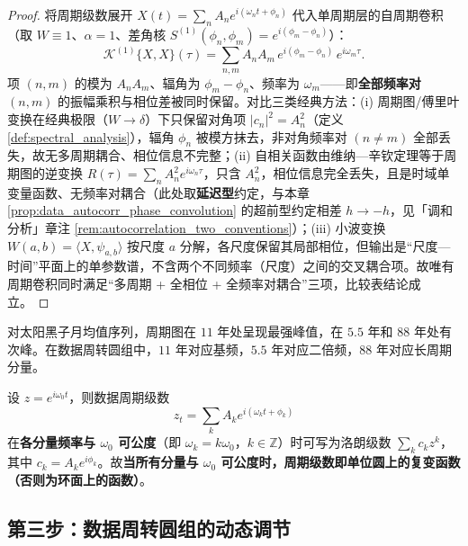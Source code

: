 \begin{proof}
将周期级数展开 $X(t) = \sum_n A_n e^{i(\omega_n t + \phi_n)}$ 代入单周期层的自周期卷积（取 $W \equiv 1$、$\alpha = 1$、差角核 $S^{(1)}(\phi_n, \phi_m) = e^{i(\phi_m - \phi_n)}$）：
\[
\mathcal{K}^{(1)}\{X, X\}(\tau) = \sum_{n,m} A_n A_m \, e^{i(\phi_m - \phi_n)} \, e^{i\omega_m \tau}.
\]
项 $(n,m)$ 的模为 $A_n A_m$、辐角为 $\phi_m - \phi_n$、频率为 $\omega_m$——即\textbf{全部频率对} $(n,m)$ 的振幅乘积与相位差被同时保留。对比三类经典方法：(i) 周期图/傅里叶变换在经典极限（$W \to \delta$）下只保留对角项 $|c_n|^2 = A_n^2$（定义 \ref{def:spectral_analysis}），辐角 $\phi_n$ 被模方抹去，非对角频率对 $(n \neq m)$ 全部丢失，故无多周期耦合、相位信息不完整；(ii) 自相关函数由维纳—辛钦定理等于周期图的逆变换 $R(\tau) = \sum_n A_n^2 e^{i\omega_n \tau}$，只含 $A_n^2$，相位信息完全丢失，且是时域单变量函数、无频率对耦合（此处取\textbf{延迟型}约定，与本章 \cref{prop:data_autocorr_phase_convolution} 的超前型约定相差 $h\to-h$，见「调和分析」章注 \ref{rem:autocorrelation_two_conventions}）；(iii) 小波变换 $W(a,b) = \langle X, \psi_{a,b}\rangle$ 按尺度 $a$ 分解，各尺度保留其局部相位，但输出是“尺度—时间”平面上的单参数谱，不含两个不同频率（尺度）之间的交叉耦合项。故唯有周期卷积同时满足“多周期 + 全相位 + 全频率对耦合”三项，比较表结论成立。
\end{proof}

\begin{example}[数据周期级数构建实例]\label{ex:data_series_example}
对太阳黑子月均值序列，周期图在 $11$ 年处呈现最强峰值，在 $5.5$ 年和 $88$ 年处有次峰。在数据周转圆组中，$11$ 年对应基频，$5.5$ 年对应二倍频，$88$ 年对应长周期分量。
\end{example}

\begin{remark}[周期级数即复变函数]\label{rem:data_series_complex}
设 $z=e^{i\omega_0t}$，则数据周期级数
\[
z_t=\sum_k A_k e^{i(\omega_k t+\phi_k)}
\]
在\textbf{各分量频率与 $\omega_0$ 可公度}（即 $\omega_k=k\omega_0$，$k\in\mathbb Z$）时可写为洛朗级数 $\sum_k c_k z^k$，其中 $c_k=A_k e^{i\phi_k}$。故\textbf{当所有分量与 $\omega_0$ 可公度时，周期级数即单位圆上的复变函数（否则为环面上的函数）}。
\end{remark}

\subsection{第三步：数据周转圆组的动态调节}

